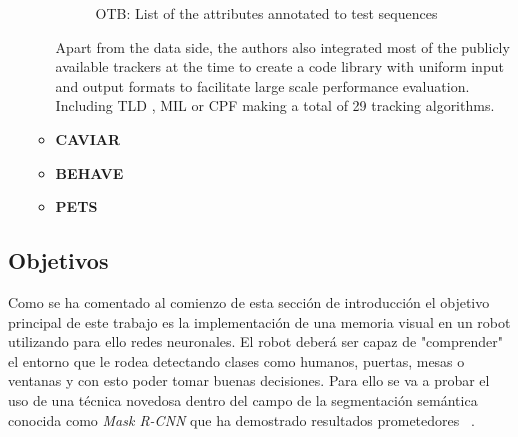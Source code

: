 \documentclass{bmvc2k}
\begin{document}
\begin{itemize}
\begin{itemize}
\begin{figure}[h!]
\begin{center}
\caption{OTB: List of the attributes annotated to test sequences ~\cite{wu2013online}}
\label{fig:otb}
\end{center}
\end{figure}
Apart from the data side, the authors also integrated most of the publicly available trackers at the time to create a code library with uniform input and output formats to facilitate large scale performance evaluation. Including TLD \cite{kalal2010pn}, MIL \cite{babenko2009visual} or CPF \cite{perez2002color} making a total of 29 tracking algorithms.
\item \textbf{CAVIAR} %
\item \textbf{BEHAVE} %
\item \textbf{PETS} %
\end{itemize}
\end{itemize}
\subsection{Objetivos}
Como se ha comentado al comienzo de esta sección de introducción el objetivo principal de este trabajo es la implementación de una memoria visual en un robot utilizando para ello redes neuronales. El robot deberá ser capaz de "comprender" el entorno que le rodea detectando clases como humanos, puertas, mesas o ventanas y con esto poder tomar buenas decisiones. Para ello se va a probar el uso de una técnica novedosa dentro del campo de la segmentación semántica conocida como \textit{Mask R-CNN} que ha demostrado resultados prometedores ~\cite{he2017mask}.

\end{document}
